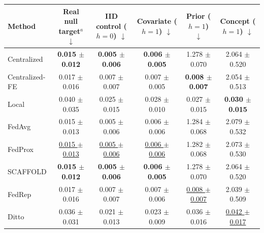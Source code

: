 \begin{tabular}{lccccc}
\toprule
Method & Real null target$^{a}$ $\downarrow$ & IID control ($h=0$) $\downarrow$ & Covariate ($h=1$) $\downarrow$ & Prior ($h=1$) $\downarrow$ & Concept ($h=1$) $\downarrow$ \\
\midrule
Centralized & \textbf{0.015 $\pm$ 0.012} & \textbf{0.005 $\pm$ 0.006} & \textbf{0.006 $\pm$ 0.005} & 1.278 $\pm$ 0.070 & 2.064 $\pm$ 0.520 \\
Centralized-FE & 0.017 $\pm$ 0.016 & 0.007 $\pm$ 0.007 & 0.007 $\pm$ 0.005 & \textbf{0.008 $\pm$ 0.007} & 2.054 $\pm$ 0.513 \\
Local & 0.040 $\pm$ 0.035 & 0.025 $\pm$ 0.015 & 0.028 $\pm$ 0.010 & 0.027 $\pm$ 0.015 & \textbf{0.030 $\pm$ 0.015} \\
FedAvg & 0.015 $\pm$ 0.013 & 0.005 $\pm$ 0.006 & 0.006 $\pm$ 0.006 & 1.284 $\pm$ 0.068 & 2.079 $\pm$ 0.532 \\
FedProx & \underline{0.015 $\pm$ 0.013} & \underline{0.005 $\pm$ 0.006} & \underline{0.006 $\pm$ 0.006} & 1.282 $\pm$ 0.068 & 2.073 $\pm$ 0.530 \\
SCAFFOLD & \textbf{0.015 $\pm$ 0.012} & \textbf{0.005 $\pm$ 0.006} & \textbf{0.006 $\pm$ 0.005} & 1.278 $\pm$ 0.070 & 2.064 $\pm$ 0.520 \\
FedRep & 0.017 $\pm$ 0.016 & 0.007 $\pm$ 0.007 & 0.007 $\pm$ 0.006 & \underline{0.008 $\pm$ 0.007} & 2.039 $\pm$ 0.509 \\
Ditto & 0.036 $\pm$ 0.031 & 0.021 $\pm$ 0.013 & 0.023 $\pm$ 0.009 & 0.036 $\pm$ 0.016 & \underline{0.042 $\pm$ 0.017} \\
\bottomrule
\end{tabular}
